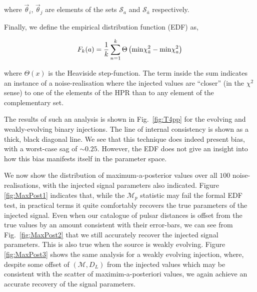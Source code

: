 \documentclass[prd,showpacs,nofootinbib]{revtex4}
\newcommand{\incgraph}[3]{\texttt{[image: \#3]}}
\begin{document}
where $\vec\theta_i$, $\vec\theta_j$ are elements of the sets $\mathcal{S}_a$ and $\mathcal{S}_{\bar a}$ respectively.

Finally, we define the empirical distribution function (EDF) as,

\begin{equation}
F_k(a) = \frac{1}{k}\sum_{n=1}^k\Theta\left({\rm min} \chi_{\bar a}^2 - {\rm min} \chi_a^2\right)
\end{equation}

where $\Theta(x)$ is the Heaviside step-function. The term inside the sum indicates an instance of a noise-realisation where the injected values are ``closer'' (in the $\chi^2$ sense) to one of the elements of the HPR than to any element of the complementary set. 

The results of such an analysis is shown in Fig.\ \ref{fig:T4pp} for the evolving and weakly-evolving binary injections. The line of internal consistency is shown as a thick, black diagonal line. We see that this technique does indeed present bias, with a worst-case sag of $\sim 0.25$. However, the EDF does not give an insight into how this bias manifests itself in the parameter space. 

We now show the distribution of maximum-a-posterior values over all $100$ noise-realisations, with the injected signal parameters also indicated. Figure \ref{fig:MaxPost1} indicates that, while the {\bf $\mathcal{M}_p$} statistic may fail the formal EDF test, in practical terms it quite comfortably recovers the true parameters of the injected signal. Even when our catalogue of pulsar distances is offset from the true values by an amount consistent with their error-bars, we can see from Fig.\ \ref{fig:MaxPost2} that we still accurately recover the injected signal parameters. This is also true when the source is weakly evolving. Figure \ref{fig:MaxPost3} shows the same analysis for a weakly evolving injection, where, despite some offset of $(\mathcal{M},D_L)$ from the injected values which may be consistent with the scatter of maximim-a-posteriori values, we again achieve an accurate recovery of the signal parameters.



\end{document}
